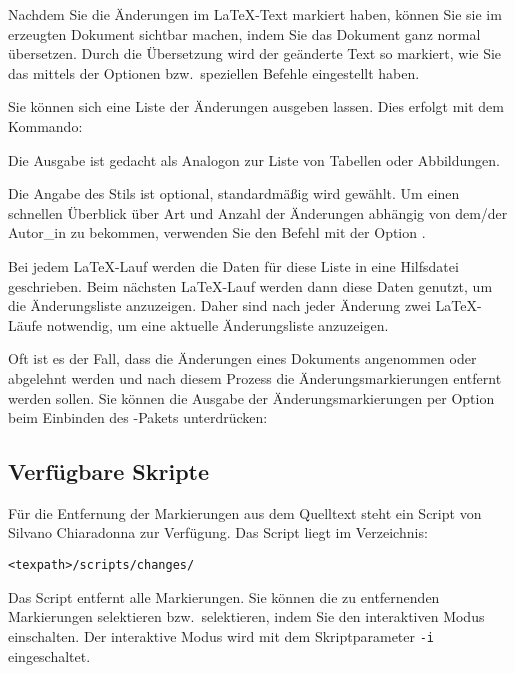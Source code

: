 Nachdem Sie die Änderungen im \LaTeX-Text markiert haben, können Sie sie im erzeugten Dokument sichtbar machen, indem Sie das Dokument ganz normal übersetzen.
Durch die Übersetzung wird der geänderte Text so markiert, wie Sie das mittels der Optionen bzw.\ speziellen Befehle eingestellt haben.


Sie können sich eine Liste der Änderungen ausgeben lassen.
Dies erfolgt mit dem Kommando:


Die Ausgabe ist gedacht als Analogon zur Liste von Tabellen oder Abbildungen.

Die Angabe des Stils ist optional, standardmäßig wird  gewählt.
Um einen schnellen Überblick über Art und Anzahl der Änderungen abhängig von dem/der Autor\_in zu bekommen, verwenden Sie den Befehl mit der Option .

Bei jedem \LaTeX-Lauf werden die Daten für diese Liste in eine Hilfsdatei geschrieben.
Beim nächsten \LaTeX-Lauf werden dann diese Daten genutzt, um die Änderungsliste anzuzeigen.
Daher sind nach jeder Änderung zwei \LaTeX-Läufe notwendig, um eine aktuelle Änderungsliste anzuzeigen.


Oft ist es der Fall, dass die Änderungen eines Dokuments angenommen oder abgelehnt werden und nach diesem Prozess die Änderungsmarkierungen entfernt werden sollen.
Sie können die Ausgabe der Änderungsmarkierungen per Option beim Einbinden des -Pakets unterdrücken:


\subsection{Verfügbare Skripte}

Für die Entfernung der Markierungen aus dem Quelltext steht ein Script von Silvano Chiaradonna zur Verfügung.
Das Script liegt im Verzeichnis:

\texttt{<texpath>/scripts/changes/}

Das Script entfernt alle Markierungen.
Sie können die zu entfernenden Markierungen selektieren bzw.\ selektieren, indem Sie den interaktiven Modus einschalten.
Der interaktive Modus wird mit dem Skriptparameter \texttt{-i} eingeschaltet.


